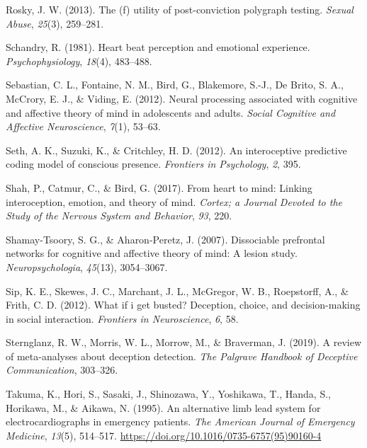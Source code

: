 \documentclass[
  man,mask,floatsintext]{apa6}
\newlength{\cslhangindent}
\newlength{\cslentryspacingunit} %
\newenvironment{CSLReferences}[2] %
 {%
  \setlength{\parindent}{0pt}
  \ifodd #1
  \let\oldpar\par
  \def\par{\hangindent=\cslhangindent\oldpar}
  \fi
  \setlength{\parskip}{#2\cslentryspacingunit}
 }%
 {}
\begin{document}
\begin{CSLReferences}{1}{0}
\leavevmode{}%
Rosky, J. W. (2013). The (f) utility of post-conviction polygraph testing. \emph{Sexual Abuse}, \emph{25}(3), 259--281.

\leavevmode{}%
Schandry, R. (1981). Heart beat perception and emotional experience. \emph{Psychophysiology}, \emph{18}(4), 483--488.

\leavevmode{}%
Sebastian, C. L., Fontaine, N. M., Bird, G., Blakemore, S.-J., De Brito, S. A., McCrory, E. J., \& Viding, E. (2012). Neural processing associated with cognitive and affective theory of mind in adolescents and adults. \emph{Social Cognitive and Affective Neuroscience}, \emph{7}(1), 53--63.

\leavevmode{}%
Seth, A. K., Suzuki, K., \& Critchley, H. D. (2012). An interoceptive predictive coding model of conscious presence. \emph{Frontiers in Psychology}, \emph{2}, 395.

\leavevmode{}%
Shah, P., Catmur, C., \& Bird, G. (2017). From heart to mind: Linking interoception, emotion, and theory of mind. \emph{Cortex; a Journal Devoted to the Study of the Nervous System and Behavior}, \emph{93}, 220.

\leavevmode{}%
Shamay-Tsoory, S. G., \& Aharon-Peretz, J. (2007). Dissociable prefrontal networks for cognitive and affective theory of mind: A lesion study. \emph{Neuropsychologia}, \emph{45}(13), 3054--3067.

\leavevmode{}%
Sip, K. E., Skewes, J. C., Marchant, J. L., McGregor, W. B., Roepstorff, A., \& Frith, C. D. (2012). What if i get busted? Deception, choice, and decision-making in social interaction. \emph{Frontiers in Neuroscience}, \emph{6}, 58.

\leavevmode{}%
Sternglanz, R. W., Morris, W. L., Morrow, M., \& Braverman, J. (2019). A review of meta-analyses about deception detection. \emph{The Palgrave Handbook of Deceptive Communication}, 303--326.

\leavevmode{}%
Takuma, K., Hori, S., Sasaki, J., Shinozawa, Y., Yoshikawa, T., Handa, S., Horikawa, M., \& Aikawa, N. (1995). An alternative limb lead system for electrocardiographs in emergency patients. \emph{The American Journal of Emergency Medicine}, \emph{13}(5), 514--517. \url{https://doi.org/10.1016/0735-6757(95)90160-4}


\end{CSLReferences}
\end{document}
